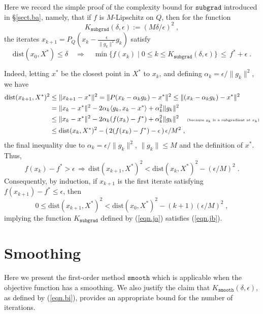 \documentclass[reqno, 11pt]{amsart}
\numberwithin{equation}{section}
\newcommand{\lin}{\langle}
\newcommand{\rin}{\rangle}
\newcommand{\subgrad}{\mathtt{subgrad}}
\newcommand{\smooth}{\mathtt{smooth}}
\newcommand{\dist}{\mathrm{dist}}
\begin{document}
Here we record the simple proof of the complexity bound for $ \subgrad $ introduced in \S\ref{sect.ba}, namely, that if $ f $ is $ M $-Lipschitz on $ Q $, then for the function 
\begin{equation}  \label{eqn.ja}
  K_{\subgrad}(\delta, \epsilon ) :=  (M \delta/ \epsilon)^2  \; , 
\end{equation}
the iterates $ x_{k+1} = P_Q ( x_k - \frac{\epsilon}{ \| g_k \|^2} g_k ) $ satisfy
\begin{equation}  \label{eqn.jb}
   \dist(x_0, X^*) \leq \delta \quad \Rightarrow \quad  \min \{ f(x_k) \mid 0 \leq k \leq K_{\subgrad}(\delta , \epsilon) \} \, \leq \, f^* + \epsilon \; .   
   \end{equation}
           
    
Indeed, letting $ x^* $ be the closest point in $ X^* $ to $ x_k $, and defining $ \alpha_k = \epsilon/\| g_k \|^2 $, we have
\begin{align*} 
     \dist(x_{k+1}, X^*)^2 & \leq \| x_{k+1} - x^* \|^2 
                           = \| P( x_k - \alpha_k g_k) - x^* \|^2 
                      \leq \| (x_k - \alpha_k g_k) - x^* \|^2 \\
                      & = \| x_k - x^* \|^2 - 2 \alpha_k \lin g_k, x_k - x^* \rin + \alpha_k^2 \| g_k \|^2  \\
             & \leq \| x_k - x^* \|^2 - 2 \alpha_k \large(f(x_k) - f^* \large) +  \alpha_k^2 \| g_k \|^2  \quad \textrm{\tiny (because $ g_k $ is a subgradient at $ x_k $)}\\
             & \leq \dist(x_k, X^*)^2 -  \large( \, 2 \large( f(x_k) - f^*   \large)   - \epsilon \, \large) \, \epsilon /M^2 \; ,  
\end{align*}
the final inequality due to $ \alpha_k = \epsilon/ \| g_k \|^2 $, $ \| g_k \| \leq M $ and the definition of $ x^* $. Thus, 
\[  f(x_k) - f^* > \epsilon \,  \Rightarrow \,   \dist(x_{k+1}, X^*)^2 < \dist(x_k, X^*)^2 - (\epsilon/M)^2 \; . \]
Consequently, by induction, if $ x_{k+1} $ is the first iterate satisfying $ f(x_{k+1}) - f^* \leq  \epsilon $, then 
\[ 0 \leq  \dist(x_{k+1},X^*)^2 < \dist(x_0,X^*)^2 - (k+1) (\epsilon/M)^2 \; , \]
  implying the function $ K_{\subgrad} $ defined by (\ref{eqn.ja})  satisfies (\ref{eqn.jb}).
  
  \section{{\bf Smoothing}} \label{sect.k} 
  
  Here we present the first-order method $ \smooth $ which is applicable when the objective function has a smoothing. We also justify the claim that $ K_{\smooth}(\delta, \epsilon) $, as defined by (\ref{eqn.bi}), provides an appropriate bound for the number of iterations. 
\end{document}
